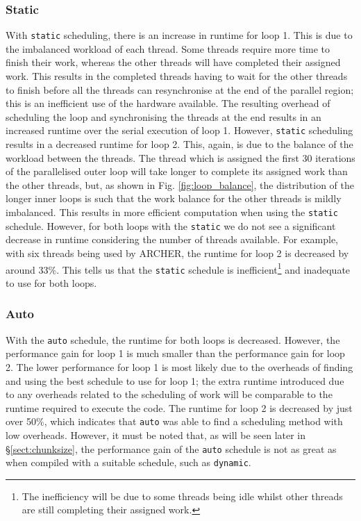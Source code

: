 \documentclass[11pt, a4paper]{article}
\begin{document}
			\subsubsection{Static} \label{sect:static_np}
				With \texttt{static} scheduling, there is an increase in runtime for loop 1. This is due to the imbalanced workload of each thread. Some threads require more time to finish their work, whereas the other threads will have completed their assigned work. This results in the completed threads having to wait for the other threads to finish before all the threads can resynchronise at the end of the parallel region; this is an inefficient use of the hardware available. The resulting overhead of scheduling the loop and synchronising the threads at the end results in an increased runtime over the serial execution of loop 1. However, \texttt{static} scheduling results in a decreased runtime for loop 2. This, again, is due to the balance of the workload between the threads. The thread which is assigned the first 30 iterations of the parallelised outer loop will take longer to complete its assigned work than the other threads, but, as shown in Fig. \ref{fig:loop_balance}, the distribution of the longer inner loops is such that the work balance for the other threads is mildly imbalanced. This results in more efficient computation when using the \texttt{static} schedule. However, for both loops with the \texttt{static} we do not see a significant decrease in runtime considering the number of threads available. For example, with six threads being used by ARCHER, the runtime for loop 2 is decreased by around 33\%. This tells us that the \texttt{static} schedule is inefficient\footnote{The inefficiency will be due to some threads being idle whilst other threads are still completing their assigned work.} and inadequate to use for both loops.
				
			\subsubsection{Auto}
				With the \texttt{auto} schedule, the runtime for both loops is decreased. However, the performance gain for loop 1 is much smaller than the performance gain for loop 2. The lower performance for loop 1 is most likely due to the overheads of finding and using the best schedule to use for loop 1; the extra runtime introduced due to any overheads related to the scheduling of work will be comparable to the runtime required to execute the code. The runtime for loop 2 is decreased by just over 50\%, which indicates that \texttt{auto} was able to find a scheduling method with low overheads. However, it must be noted that, as will be seen later in \S\ref{sect:chunksize}, the performance gain of the \texttt{auto} schedule is not as great as when compiled with a suitable schedule, such as \texttt{dynamic}.
		
\end{document}
